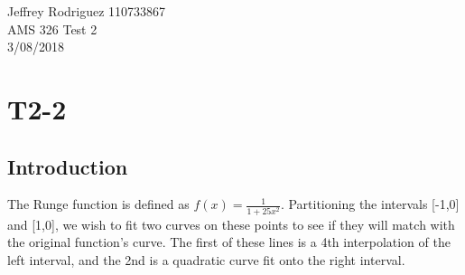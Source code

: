 \documentclass[12pt]{article}
\begin{document}
\begin{center}
Jeffrey Rodriguez 110733867\\AMS 326 Test 2 \\3/08/2018\\

\end{center}

\section*{T2-2}
\subsection*{Introduction}
The Runge function is defined as $f(x) = \frac{1}{1+25x^2}$. Partitioning the intervals [-1,0] and [1,0], we wish to fit two curves on these points to see if they will match with the original function's curve. The first of these lines is a 4th interpolation of the left interval, and the 2nd is a quadratic curve fit onto the right interval.
\end{document}
